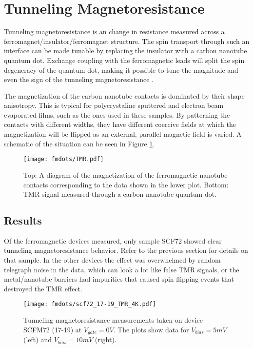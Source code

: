 \section{Tunneling Magnetoresistance}

Tunneling magnetoresistance is an change in resistance measured across a ferromagnet/insulator/ferromagnet structure. The spin transport through such an interface can be made tunable by replacing the insulator with a carbon nanotube quantum dot. Exchange coupling with the ferromagnetic leads will split the spin degeneracy of the quantum dot, making it possible to tune the magnitude and even the sign of the tunneling magnetoresistance \cite{Tsymbal2003, Sahoo2005, Thamankar2006}.

The magnetization of the carbon nanotube contacts is dominated by their shape anisotropy. This is typical for polycrystaline sputtered and electron beam evaporated films, such as the ones used in these samples. By patterning the contacts with different widths, they have different coercive fields at which the magnetization will be flipped as an external, parallel magnetic field is varied. A schematic of the situation can be seen in Figure \ref{fig:spin_valve}.

\begin{figure}
    \centering
    \texttt{[image: fmdots/TMR.pdf]}
    \caption{Top: A diagram of the magnetization of the ferromagnetic nanotube contacts corresponding to the data shown in the lower plot. Bottom: TMR signal measured through a carbon nanotube quantum dot.}
    \label{fig:spin_valve}
\end{figure}

\subsection{Results}

Of the ferromagnetic devices measured, only sample SCF72 showed clear tunneling magnetoresistance behavior. Refer to the previous section for details on that sample. In the other devices the effect was overwhelmed by random telegraph noise in the data, which can look a lot like false TMR signals, or the metal/nanotube barriers had impurities that caused spin flipping events that destroyed the TMR effect.

\begin{figure}
    \centering
    \texttt{[image: fmdots/scf72\_17-19\_TMR\_4K.pdf]}
    \caption{Tunneling magnetoresistance measurements taken on device SCFM72 (17-19) at $V_{gate} = 0V$. The plots show data for $V_{bias} = 5mV$ (left) and $V_{bias} = 10mV$ (right).}
    \label{fig:TMR_real}
\end{figure}

